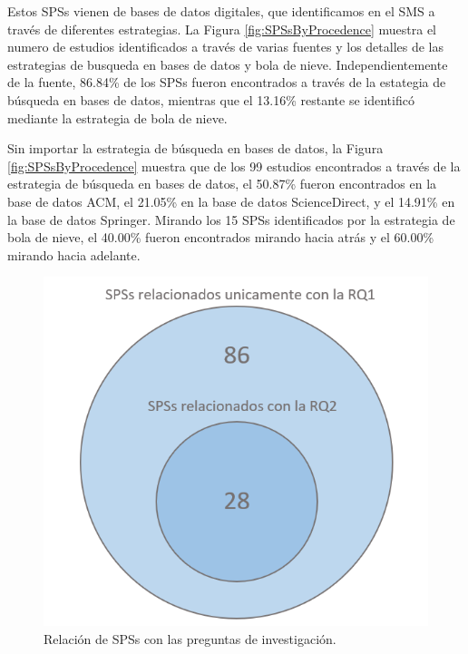 Estos SPSs vienen de bases de datos digitales, que identificamos en el SMS a través de diferentes estrategias. La Figura \ref{fig:SPSsByProcedence} muestra el numero de estudios identificados a través de varias fuentes y los detalles de las estrategias de busqueda en bases de datos y bola de nieve. Independientemente de la fuente, 86.84\% de los SPSs fueron encontrados a través de la estategia de búsqueda en bases de datos, mientras que el 13.16\% restante se identificó mediante la estrategia de bola de nieve.

Sin importar la estrategia de búsqueda en bases de datos, la Figura \ref{fig:SPSsByProcedence} muestra que de los 99 estudios encontrados a través de la estrategia de búsqueda en bases de datos, el 50.87\% fueron encontrados en la base de datos ACM, el 21.05\% en la base de datos ScienceDirect, y el 14.91\% en la base de datos Springer. Mirando los 15 SPSs identificados por la estrategia de bola de nieve, el 40.00\% fueron encontrados mirando hacia atrás y el 60.00\% mirando hacia adelante.

\begin{figure}[htbp]
	\centering
	\vspace{10pt}
	\includegraphics[scale=0.7]{resources/figures/Venn.png}
	\vspace{6pt}
	\caption{Relación de SPSs con las preguntas de investigación.}
	\label{fig:SPSsByRQs}
\end{figure}

